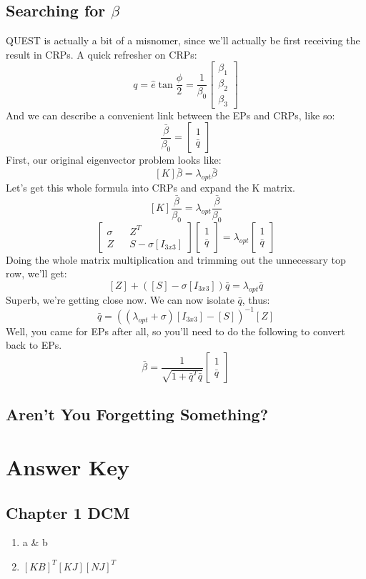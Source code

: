 \documentclass[a4paper,14pt]{extreport}
\begin{document}
\section{Searching for $\beta$}
QUEST is actually a bit of a misnomer, since we'll actually be first receiving the result in CRPs. A quick refresher on CRPs:
\[
q = \hat{e} \tan{\dfrac{\phi}{2}} = 
\dfrac{1}{\beta_0 }
\begin{bmatrix}
\beta_1\\
\beta_2\\
\beta_3
\end{bmatrix}
\]
And we can describe a convenient link between the EPs and CRPs, like so:
\[
\dfrac{\bar{\beta}}{\beta_0} = 
\begin{bmatrix}
1\\\bar{q} 
\end{bmatrix}
\]
First, our original eigenvector problem looks like:
\[
[K]\bar{\beta} = \lambda_{opt}\bar{\beta}
\]
Let's get this whole formula into CRPs and expand the K matrix.
\[
[K]\dfrac{\bar{\beta}}{\beta_0} = \lambda_{opt}\dfrac{\bar{\beta}}{\beta_0}
\]
\[
\begin{bmatrix}
\sigma&&Z^T\\
Z&&S-\sigma[I_{3x3}]
\end{bmatrix}
\begin{bmatrix}
1\\\bar{q} 
\end{bmatrix} = \lambda_{opt}
\begin{bmatrix}
1\\\bar{q} 
\end{bmatrix}
\]
Doing the whole matrix multiplication and trimming out the unnecessary top row, we'll get:
\[
[Z] + ([S] - \sigma [I_{3x3}])\bar{q} = \lambda_{opt}\bar{q}
\]
Superb, we're getting close now. We can now isolate $\bar{q}$, thus:
\[
\bar{q} = ((\lambda_{opt}+\sigma)[I_{3x3}] - [S])^{-1}[Z]
\]
Well, you came for EPs after all, so you'll need to do the following to convert back to EPs.
\[
\bar{\beta} = \dfrac{1}{\sqrt{1+\bar{q}^T\bar{q}}} 
\begin{bmatrix}
1\\\bar{q} 
\end{bmatrix}
\]
\section{Aren't You Forgetting Something?}
\chapter{Answer Key}
\section{Chapter 1 DCM}
\begin{enumerate}
\item{a \& b}
\item{$[KB]^T[KJ][NJ]^T$}


\end{enumerate}
\end{document}
